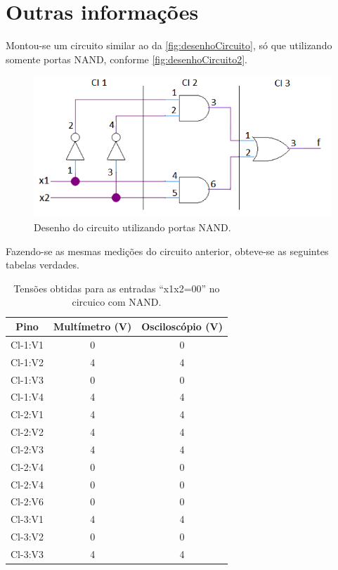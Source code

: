 \chapter{Outras informações}
	Montou-se um circuito similar ao da \autoref{fig:desenhoCircuito}, só que utilizando
	somente portas NAND, conforme \autoref{fig:desenhoCircuito2}.

	\begin{figure}[H]
		\centering
		\caption{\label{fig:desenhoCircuito2}Desenho do circuito utilizando portas NAND.}
		\includegraphics[width=1\textwidth]{img/DesenhoCircuito}
	\end{figure}

	Fazendo-se as mesmas medições do circuito anterior, obteve-se as seguintes tabelas verdades.

	\begin{table}[H]
	   \centering
	   \caption{Tensões obtidas para as entradas “x1x2=00” no circuico com NAND.}
	   \label{table:tabelaVerdade20}
	   \begin{tabular}{c|c|c}
		   \textbf{Pino} & \textbf{Multímetro (V)} & \textbf{Osciloscópio (V)}\\
		   \hline
		   Cl-1:V1 & 0 & 0 \\
		   Cl-1:V2 & 4 & 4 \\
		   Cl-1:V3 & 0 & 0 \\
		   Cl-1:V4 & 4 & 4 \\
		   \hline
		   Cl-2:V1 & 4 & 4 \\
		   Cl-2:V2 & 4 & 4 \\
		   Cl-2:V3 & 4 & 4 \\
		   Cl-2:V4 & 0 & 0 \\
		   Cl-2:V4 & 0 & 0 \\
		   Cl-2:V6 & 0 & 0 \\
		   \hline
		   Cl-3:V1 & 4 & 4 \\
		   Cl-3:V2 & 0 & 0 \\
		   Cl-3:V3 & 4 & 4 \\
	   \end{tabular}
   \end{table}

